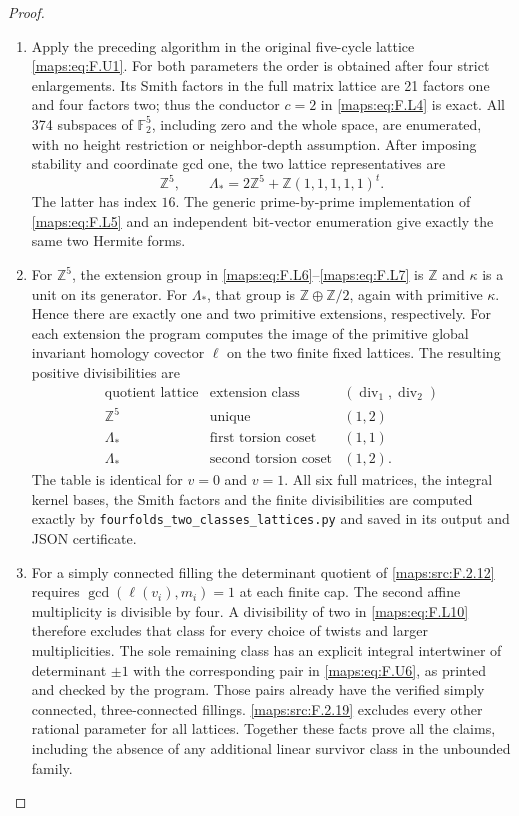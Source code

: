\documentclass[11pt,a4paper]{article}
\theoremstyle{definition}
\begin{document}
\begin{proof}
\begin{enumerate}[label=\arabic*.]
\item Apply the preceding algorithm in the original five-cycle
lattice \eqref{maps:eq:F.U1}.  For both parameters the order is obtained
after four strict enlargements.  Its Smith factors in the
full matrix lattice are 21 factors one and four factors two;
thus the conductor $c=2$ in \eqref{maps:eq:F.L4} is exact.
All 374 subspaces of $\mathbb F_2^5$, including zero and
the whole space, are enumerated, with no height restriction
or neighbor-depth assumption.
After imposing stability and coordinate gcd one, the two
lattice representatives are
\[
 \mathbb Z^5,\qquad
 \Lambda_* =2\mathbb Z^5+\mathbb Z(1,1,1,1,1)^t.
 \tag{F.L9}\label{maps:eq:F.L9}
\]
The latter has index $16$.
The generic prime-by-prime implementation of \eqref{maps:eq:F.L5} and
an independent bit-vector enumeration give exactly the
same two Hermite forms.

\item For $\mathbb Z^5$, the extension group in \eqref{maps:eq:F.L6}--\eqref{maps:eq:F.L7}
is $\mathbb Z$ and $\kappa$ is a unit on its generator.
For $\Lambda_*$, that group is
$\mathbb Z\oplus\mathbb Z/2$, again with primitive
$\kappa$.  Hence there are exactly one and two primitive
extensions, respectively.
For each extension the program computes the image of the
primitive global invariant homology covector $\ell$ on
the two finite fixed lattices.  The resulting positive
divisibilities are
\[
\begin{array}{c|c|c}
 \text{quotient lattice}&\text{extension class}&
       (\operatorname{div}_1,\operatorname{div}_2)\\\hline
 \mathbb Z^5&\text{unique}&(1,2)\\
 \Lambda_*&\text{first torsion coset}&(1,1)\\
 \Lambda_*&\text{second torsion coset}&(1,2).
\end{array}
 \tag{F.L10}\label{maps:eq:F.L10}
\]
The table is identical for $v=0$ and $v=1$.
All six full matrices, the integral kernel bases, the
Smith factors and the finite divisibilities are computed
exactly by \texttt{fourfolds\_two\_classes\_lattices.py}
and saved in its output and JSON certificate.

\item For a simply connected filling the determinant quotient
of \ref{maps:src:F.2.12} requires $\gcd(\ell(v_i),m_i)=1$ at each
finite cap.  The second affine multiplicity is divisible
by four.  A divisibility of two in \eqref{maps:eq:F.L10} therefore
excludes that class for every choice of twists and larger
multiplicities.
The sole remaining class has an explicit integral
intertwiner of determinant $\pm1$ with the corresponding
pair in \eqref{maps:eq:F.U6}, as printed and checked by the program.
Those pairs already have the verified simply connected,
three-connected fillings.  \ref{maps:src:F.2.19} excludes every other
rational parameter for all lattices.
Together these facts prove all the claims, including the
absence of any additional linear survivor class in the
unbounded family.


\end{enumerate}
\end{proof}
\end{document}
